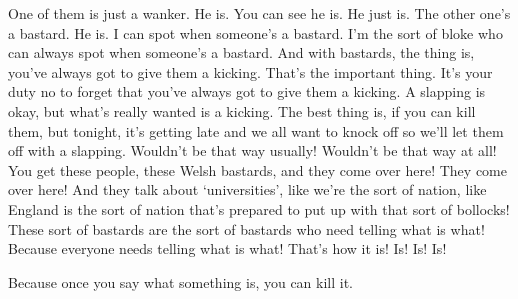 One of them is just a wanker.  He is.  You can see he is.  He just is.
The other one’s a bastard.  He is.  I can spot when someone’s a
bastard. I’m the sort of bloke who can always spot when someone’s a
bastard.  And with bastards, the thing is, you’ve always got to give
them a kicking.  That’s the important thing.  It’s your duty no to
forget that you’ve always got to give them a kicking.  A slapping is
okay, but what’s really wanted is a kicking.  The best thing is, if
you can kill them, but tonight, it’s getting late and we all want to
knock off so we’ll let them off with a slapping.  Wouldn’t be that way
usually!  Wouldn’t be that way at all!  You get these people, these
Welsh bastards, and they come over here!  They come over here!  And
they talk about ‘universities’, like we’re the sort of nation, like
England is the sort of nation that’s prepared to put up with that sort
of bollocks!  These sort of bastards are the sort of bastards who need
telling what is what!  Because everyone needs telling what is what!
That’s how it is!  Is!  Is!  Is!

Because once you say what something is, you can kill it.
